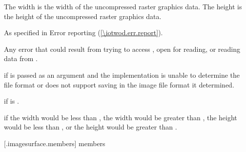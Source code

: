 \begin{itemdescr}
\pnum
The width is the width of the uncompressed raster graphics data. The height is the height of the uncompressed raster graphics data.

\pnum
\throws
As specified in Error reporting (\ref{\iotwod.err.report}).

\pnum
\errors
Any error that could result from trying to access , open  for reading, or reading data from .

\pnum
{} if  is passed as an argument and the implementation is unable to determine the file format or does not support saving in the image file format it determined.

\pnum
{} if  is .

\pnum
{} if the width would be less than , the width would be greater than , the height would be less than , or the height would be greater than .
\end{itemdescr}

 [\iotwod.imagesurface.members] { members}

